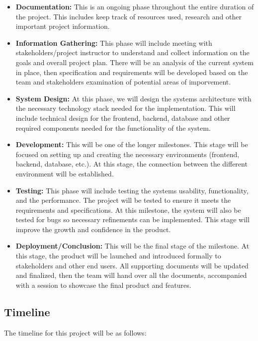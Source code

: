 \documentclass{article}
\begin{document}
\begin{itemize}
	\item \textbf{Documentation: } This is an ongoing phase throughout the entire duration of the
	project. This includes keep track of resources used, research and other important project
	information.
	\item \textbf{Information Gathering: } This phase will include meeting with stakeholders/project
	instructor to understand and collect information on the goals and overall project plan. There will
	be an analysis of the current system in place, then specification and requirements will be developed
	based on the team and stakeholders examination of potential areas of imporvement.
	\item \textbf{System Design: } At this phase, we will design the systems architecture with the
	necessary technology stack needed for the implementation. This will include technical design for the
	frontend, backend, database and other required components needed for the functionality of the system.
	\item \textbf{Development: } This will be one of the longer milestones. This stage will be focused on
	setting up and creating the necessary environments (frontend, backend, database, etc.). At this stage,
	the connection between the different environment will be established.
	\item \textbf{Testing: } This phase will include testing the systems usability, functionality, and the
	performance. The project will be tested to ensure it meets the requirements and specifications. At this
	milestone, the system will also be tested for bugs so necessary refinements can be implemented. This stage
	will improve the growth and confidence in the product.
	\item \textbf{Deployment/Conclusion: } This will be the final stage of the milestone. At this stage, the
	product will be launched and introduced formally to stakeholders and other end users. All supporting 
	documents will be updated and finalized, then the team will hand over all the documents, accompanied with a
	session to showcase the final product and features.
\end{itemize}

\subsection{Timeline}

The timeline for this project will be as follows:
\end{document}
